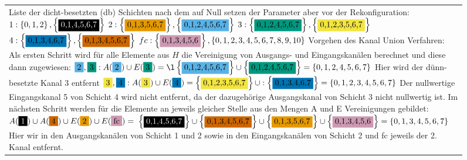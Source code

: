 \begin{figure}
\begin{minipage}[c]{1\linewidth}
\begin{tabularx}{1\linewidth}{m{0.22\linewidth}m{0.88\linewidth}}
\\
\multicolumn{2}{m{1\linewidth}}{Liste der dicht-besetzten (db) Schichten nach dem auf Null setzen der Parameter aber vor der Rekonfiguration:\newline
$1:\left\{0,1,2\right\},\left\{\colorbox{black}{\textcolor{white}{0,1,4,5,6,7}}\right\}$\newline
$2:\left\{\colorbox{orange}{0,1,3,5,6,7}\right\},\left\{\colorbox{sky}{0,1,2,4,5,6,7}\right\}$\newline
$3:\left\{\colorbox{bluegreen}{0,1,2,4,5,6,7}\right\},\left\{\colorbox{yellow}{0,1,2,3,5,6,7}\right\}$\newline
$4:\left\{\colorbox{blue2}{0,1,3,4,6,7}\right\},\left\{\colorbox{vermi}{0,1,3,4,5,6,7}\right\}$\newline
$fc:\left\{\colorbox{purple}{0,1,3,4,5,6}\right\},\left\{0,1,2,3,4,5,6,7,8,9,10\right\}$\newline
Vorgehen des Kanal Union Verfahren:
Als ersten Schritt wird für alle Elemente aus $H$ die Vereinigung von Ausgangs- und Eingangskanälen berechnet und diese dann zugewiesen:\newline
$\colorbox{sky}{2},\colorbox{bluegreen}{3}:A(\colorbox{sky}{2}) \cup E(\colorbox{bluegreen}{3})= \l\left\{\colorbox{sky}{0,1,2,4,5,6,7}\right\} \cup \left\{\colorbox{bluegreen}{0,1,2,4,5,6,7}\right\} =\left\{0,1,2,4,5,6,7\right\} $\newline
Hier wird der dünn-besetzte Kanal 3 entfernt \newline
$\colorbox{yellow}{3},\colorbox{blue2}{4}: A(\colorbox{yellow}{3}) \cup E(\colorbox{blue2}{4}) =
\left\{\colorbox{yellow}{0,1,2,3,5,6,7}\right\} \cup :\left\{\colorbox{blue2}{0,1,3,4,6,7}\right\} =\left\{0,1,2,3,4,5,6,7\right\}$\newline
Der nullwertige Eingangskanal 5 von Schicht 4 wird nicht entfernt, da der dazugehörige Ausgangskanal von Schicht 3 nicht nullwertig ist.
Im nächsten Schritt werden für die Elemente an jeweils gleicher Stelle aus den Mengen A und E Vereinigungen gebildet:
$A(\colorbox{black}{\textcolor{white}{1}})\cup A(\colorbox{vermi}{4}) \cup E(\colorbox{orange}{2}) \cup E(\colorbox{purple}{fc})=$\newline
$\left\{\colorbox{black}{\textcolor{white}{0,1,4,5,6,7}}\right\} \cup \left\{\colorbox{vermi}{0,1,3,4,5,6,7}\right\} \cup \left\{\colorbox{orange}{0,1,3,5,6,7}\right\} \cup \left\{\colorbox{purple}{0,1,3,4,5,6}\right\} = \left\{ 0,1,3,4,5,6,7\right\}$\newline
Hier wir in den Ausgangskanälen von Schicht 1 und 2 sowie in den Eingangskanälen von Schicht 2 und fc jeweils der 2. Kanal entfernt.}
\end{tabularx}
\end{minipage}
\end{figure}




